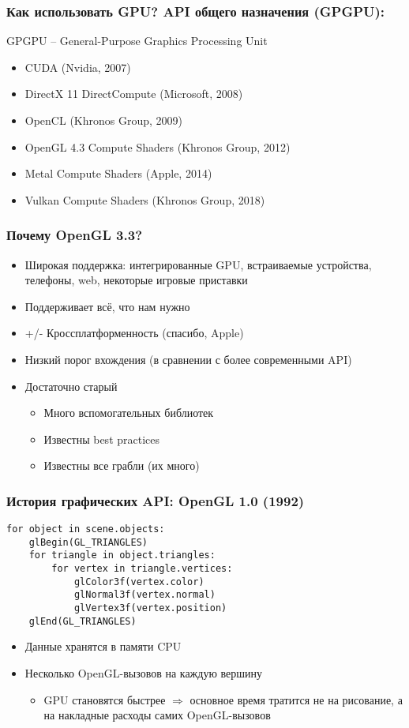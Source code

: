 \documentclass{beamer}
\begin{document}
\begin{frame}
\frametitle{Как использовать GPU? API общего назначения (GPGPU):}
GPGPU -- General-Purpose Graphics Processing Unit
\pause
\begin{itemize}
\item CUDA (Nvidia, 2007)
\pause
\item DirectX 11 DirectCompute (Microsoft, 2008)
\pause
\item OpenCL (Khronos Group, 2009)
\pause
\item OpenGL 4.3 Compute Shaders (Khronos Group, 2012)
\pause
\item Metal Compute Shaders (Apple, 2014)
\pause
\item Vulkan Compute Shaders (Khronos Group, 2018)
\end{itemize}
\end{frame}

\begin{frame}
\frametitle{Почему OpenGL 3.3?}
\pause
\begin{itemize}
\item Широкая поддержка: интегрированные GPU, встраиваемые устройства, телефоны, web, некоторые игровые приставки
\pause
\item Поддерживает всё, что нам нужно
\pause
\item +/- Кроссплатформенность \pause (спасибо, Apple)
\pause
\item Низкий порог вхождения (в сравнении с более современными API)
\pause
\item Достаточно старый
\begin{itemize}
\item Много вспомогательных библиотек
\item Известны best practices
\item Известны все грабли \pause (их много)
\end{itemize}
\end{itemize}
\end{frame}

\begin{frame}[fragile]
\frametitle{История графических API: OpenGL 1.0 (1992)}
\begin{verbatim}
for object in scene.objects:
    glBegin(GL_TRIANGLES)
    for triangle in object.triangles:
        for vertex in triangle.vertices:
            glColor3f(vertex.color)
            glNormal3f(vertex.normal)
            glVertex3f(vertex.position)
    glEnd(GL_TRIANGLES)
\end{verbatim}
\pause
\begin{itemize}
\item Данные хранятся в памяти CPU
\pause
\item Несколько OpenGL-вызовов на каждую вершину
\pause
\begin{itemize}
\item GPU становятся быстрее $\Longrightarrow$ основное время тратится не на рисование, а на накладные расходы самих OpenGL-вызовов
\end{itemize}
\end{itemize}
\end{frame}
\end{document}

